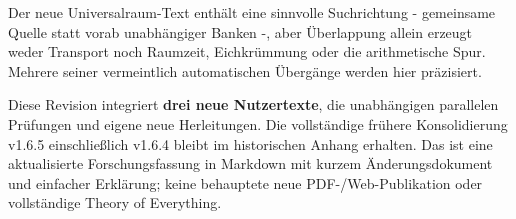 Der neue Universalraum-Text enthält eine sinnvolle Suchrichtung -
gemeinsame Quelle statt vorab unabhängiger Banken -, aber Überlappung
allein erzeugt weder Transport noch Raumzeit, Eichkrümmung oder die
arithmetische Spur. Mehrere seiner vermeintlich automatischen Übergänge
werden hier präzisiert.

Diese Revision integriert \textbf{drei neue Nutzertexte}, die
unabhängigen parallelen Prüfungen und eigene neue Herleitungen. Die
vollständige frühere Konsolidierung v1.6.5 einschließlich v1.6.4 bleibt
im historischen Anhang erhalten. Das ist eine aktualisierte
Forschungsfassung in Markdown mit kurzem Änderungsdokument und einfacher
Erklärung; keine behauptete neue PDF-/Web-Publikation oder vollständige
Theory of Everything.

